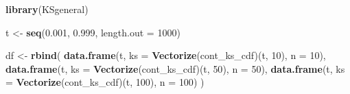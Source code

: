 \documentclass[
  12pt,
]{book}
\newenvironment{Shaded}{\begin{snugshade}}{\end{snugshade}}
\newcommand{\DataTypeTok}[1]{\textcolor[rgb]{0.13,0.29,0.53}{#1}}
\newcommand{\DecValTok}[1]{\textcolor[rgb]{0.00,0.00,0.81}{#1}}
\newcommand{\FloatTok}[1]{\textcolor[rgb]{0.00,0.00,0.81}{#1}}
\newcommand{\KeywordTok}[1]{\textcolor[rgb]{0.13,0.29,0.53}{\textbf{#1}}}
\newcommand{\NormalTok}[1]{#1}
\newcommand{\StringTok}[1]{\textcolor[rgb]{0.31,0.60,0.02}{#1}}
\begin{document}
\begin{Shaded}
\begin{Highlighting}[]
\KeywordTok{library}\NormalTok{(KSgeneral)}

\NormalTok{t \textless{}{-}}\StringTok{ }\KeywordTok{seq}\NormalTok{(}\FloatTok{0.001}\NormalTok{, }\FloatTok{0.999}\NormalTok{, }\DataTypeTok{length.out =} \DecValTok{1000}\NormalTok{)}

\NormalTok{df \textless{}{-}}\StringTok{ }\KeywordTok{rbind}\NormalTok{(}
  \KeywordTok{data.frame}\NormalTok{(t, }\DataTypeTok{ks =} \KeywordTok{Vectorize}\NormalTok{(cont\_ks\_cdf)(t, }\DecValTok{10}\NormalTok{), }\DataTypeTok{n =} \DecValTok{10}\NormalTok{),}
  \KeywordTok{data.frame}\NormalTok{(t, }\DataTypeTok{ks =} \KeywordTok{Vectorize}\NormalTok{(cont\_ks\_cdf)(t, }\DecValTok{50}\NormalTok{), }\DataTypeTok{n =} \DecValTok{50}\NormalTok{),}
  \KeywordTok{data.frame}\NormalTok{(t, }\DataTypeTok{ks =} \KeywordTok{Vectorize}\NormalTok{(cont\_ks\_cdf)(t, }\DecValTok{100}\NormalTok{), }\DataTypeTok{n =} \DecValTok{100}\NormalTok{)}
\NormalTok{)}
\end{Highlighting}
\end{Shaded}
\end{document}
